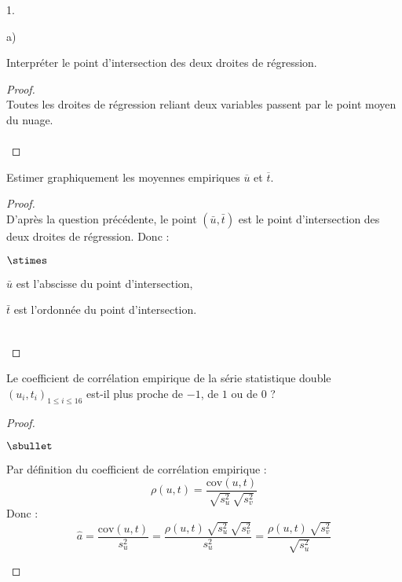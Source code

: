 \begin{noliste}{1.}
\begin{noliste}{a)}
  
  
  \newpage
  
  
  
  \item Interpréter le point d'intersection des deux droites de 
  régression.
  
  \begin{proof}~\\
   Toutes les droites de régression reliant deux variables passent
   par le point moyen du nuage.~\\[-.8cm]
   ~\\[-1cm]
  \end{proof}

  
  \item Estimer graphiquement les moyennes empiriques $\overline{u}$ et 
  $\overline{t}$.
  
  \begin{proof}~\\
   D'après la question précédente, le point $(\bar{u}, \bar{t})$ 
   est le point d'intersection des deux droites de régression. Donc :
   \begin{noliste}{$\stimes$}
    \item $\bar{u}$ est l'abscisse du point d'intersection,
    \item $\bar{t}$ est l'ordonnée du point d'intersection.
   \end{noliste}
   ~\\[-1cm]
  \end{proof}
  
  \item Le coefficient de corrélation empirique de la série statistique 
  double $(u_i,t_i)_{1 \leq i \leq 16}$ est-il plus 
  proche de $-1$, de $1$ ou de $0$ ?
  
  \begin{proof}~
   \begin{noliste}{$\sbullet$}
    \item Par définition du coefficient de corrélation empirique :
    \[
     \rho(u,t) = \dfrac{\text{cov}(u,t)}{\sqrt{s_u^2} \, \sqrt{s_v^2}}
    \]
    Donc :
    \[
     \hat{a} = \dfrac{\text{cov}(u,t)}{s_u^2} = 
     \dfrac{\rho(u,t) \, \sqrt{s_u^2} \, \sqrt{s_v^2}}{s_u^2} = 
     \dfrac{\rho(u,t) \, \sqrt{s_v^2}}{\sqrt{s_u^2}}
    \]
   

\end{noliste}
\end{proof}
\end{noliste}
\end{noliste}
